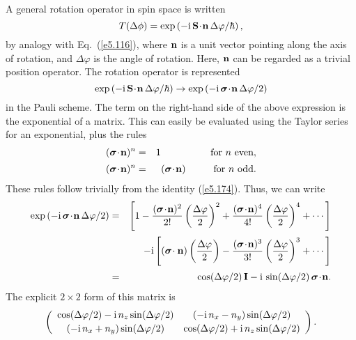 A general rotation operator in spin space is written
\begin{equation}
T (\Delta\phi) = \exp\left(-{\rm i} \,{\bf S}\!\cdot\!{\bf n}\,\Delta\varphi/\hbar\right),
\end{equation}
by analogy with Eq.~(\ref{e5.116}), where ${\bf n}$ is a unit vector pointing along
the axis of rotation, and $\Delta\varphi$ is the angle of rotation.
Here, ${\bf n}$ can be regarded as a trivial position operator.  The
rotation operator is represented 
\begin{equation}
\exp\left(-{\rm i} \,{\bf S}\!\cdot\!{\bf n}\,\Delta\varphi/\hbar\right)\rightarrow
\exp\left(-{\rm i} \,\mbox{\boldmath$\sigma$}\!\cdot\!{\bf n}\,\Delta\varphi/2\right)
\end{equation}
in the Pauli scheme. 
The term on the right-hand side of the above  expression is the exponential
of a matrix. This can easily be evaluated using the Taylor series for an exponential,
plus the rules
\begin{eqnarray}
(\mbox{\boldmath$\sigma$}\!\cdot \!{\bf n})^n &=& 1 \mbox{\hspace{1.79cm}for $n$ even},\\[0.5ex]
(\mbox{\boldmath$\sigma$}\!\cdot \!{\bf n})^n &=&(\mbox{\boldmath$\sigma$}\!\cdot \!{\bf n})
 \mbox{\hspace{1cm}for $n$ odd}.
\end{eqnarray}
These rules follow trivially from the identity (\ref{e5.174}).  Thus, we can write
\begin{eqnarray}
\exp\left(-{\rm i} \,\bsigma\!\cdot\!{\bf n}\,\Delta\varphi/2\right)&=& 
\left[ 1 - \frac{(\bsigma \! \cdot \! {\bf n})^2}{2!} \left(\frac{\Delta\varphi}{2}
\right)^2 + \frac{(\bsigma \! \cdot \! {\bf n})^4}{4!} \left(\frac{\Delta\varphi}{2}
\right)^4 + \cdots\right]\nonumber\\[0.5ex]
&& - {\rm i} \left[ (\bsigma \! \cdot {\bf n} )\left( \frac{\Delta\varphi}{2}\right)-
\frac{(\bsigma \! \cdot \! {\bf n})^3}{3!} \left(\frac{\Delta\varphi}{2}\right)^3
+ \cdots\right]\nonumber\\[0.5ex]
&=& \cos(\Delta\varphi/2)\,{\bf I}- {\rm i}\,\sin (\Delta\varphi/2)\,\bsigma\!\cdot\! {\bf n}.
\end{eqnarray}
The explicit $2\times 2$ form of this matrix is
\begin{equation}
\left(\begin{array}{cc} 
\cos(\Delta\varphi/2) - {\rm i}\,n_z \sin(\Delta\varphi/2)&
(-{\rm i}\,n_x - n_y) \sin(\Delta\varphi/2) \\[0.5ex]
(-{\rm i}\,n_x + n_y) \sin(\Delta\varphi/2) &
\cos(\Delta\varphi/2) + {\rm i}\, n_z \sin(\Delta\varphi/2)
\end{array} \right).
\end{equation}
